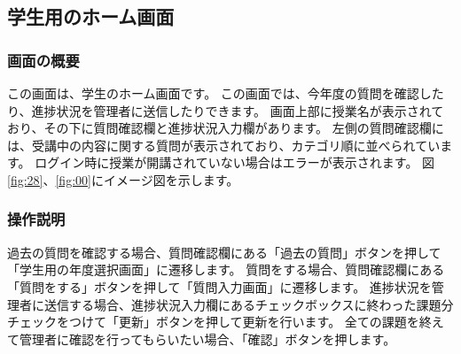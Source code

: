 \newpage

\subsection{学生用のホーム画面}
\subsubsection{画面の概要}
この画面は、学生のホーム画面です。
この画面では、今年度の質問を確認したり、進捗状況を管理者に送信したりできます。
画面上部に授業名が表示されており、その下に質問確認欄と進捗状況入力欄があります。
左側の質問確認欄には、受講中の内容に関する質問が表示されており、カテゴリ順に並べられています。
ログイン時に授業が開講されていない場合はエラーが表示されます。
図\ref{fig:28}、\ref{fig:00}にイメージ図を示します。

\subsubsection{操作説明}
過去の質問を確認する場合、質問確認欄にある「過去の質問」ボタンを押して「学生用の年度選択画面」に遷移します。
質問をする場合、質問確認欄にある「質問をする」ボタンを押して「質問入力画面」に遷移します。
進捗状況を管理者に送信する場合、進捗状況入力欄にあるチェックボックスに終わった課題分チェックをつけて「更新」ボタンを押して更新を行います。
全ての課題を終えて管理者に確認を行ってもらいたい場合、「確認」ボタンを押します。



